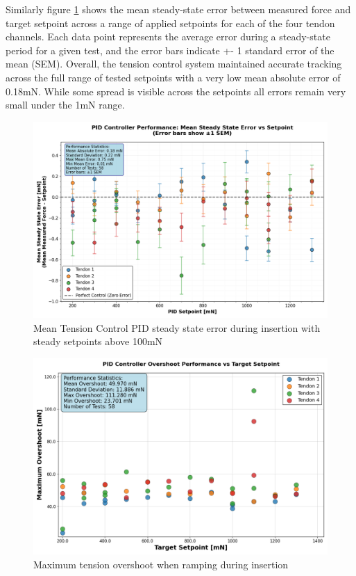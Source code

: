 Similarly figure \ref{fig:steadtyStatePIDError} shows the mean steady-state error between measured force and target setpoint across a range of applied setpoints for each of the four tendon channels. Each data point represents the average error during a steady-state period for a given test, and the error bars indicate +- 1 standard error of the mean (SEM). Overall, the tension control system maintained accurate tracking across the full range of tested setpoints with a very low mean absolute error of 0.18mN. While some spread is visible across the setpoints all errors remain very small under the 1mN range.



\begin{figure} [H]
    \centering
    \includegraphics[width=0.9\linewidth]{images/PID performance/steadystateErrors.png}
    \caption{Mean Tension Control PID steady state error during insertion with steady setpoints above 100mN}
    \label{fig:steadtyStatePIDError}
\end{figure}

\begin{figure}[H]
    \centering
    \includegraphics[width=0.9\linewidth]{images/PID performance/rampingOvershoot.png}
    \caption{Maximum tension overshoot when ramping during insertion}
    \label{fig:overshoot}
\end{figure}

